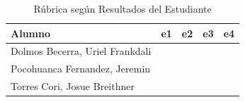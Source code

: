 \documentclass[12pt,oneside,spanish]{article}
\begin{document}
\begin{table}[h!]
\caption{Rúbrica según Resultados del Estudiante}
\centering
\begin{tabular}{lcccc}
\hline 
Alumno & e1 & e2 & e3 & e4\tabularnewline
\hline 
\hline 
Dolmos Becerra, Uriel Frankdali &  &  &  & \tabularnewline
\hline 
Pocohuanca Fernandez, Jeremin &  &  &  & \tabularnewline
\hline 
Torres Cori, Josue Breithner &  &  &  & \tabularnewline
\hline
\end{tabular}
\label{tab:rubricas}
\end{table}
\end{document}
